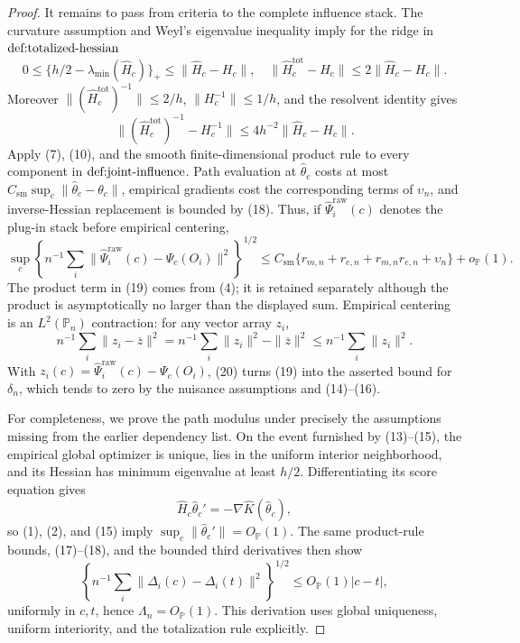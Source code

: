 \documentclass{article}
\begin{document}
\begin{proof}
It remains to pass from criteria to the complete influence stack. The curvature assumption and Weyl's eigenvalue inequality imply for the ridge in \(\textnormal{def:totalized-hessian}\)
\[
 0\leq\{h/2-\lambda_{\min}(\widehat H_c)\}_+
 \leq\|\widehat H_c-H_c\|,
 \quad
 \|\widehat H_c^{\mathrm{tot}}-H_c\|
 \leq2\|\widehat H_c-H_c\|.
 \tag{17}
\]
Moreover \(\|(\widehat H_c^{\mathrm{tot}})^{-1}\|\leq2/h\), \(\|H_c^{-1}\|\leq1/h\), and the resolvent identity gives
\[
 \| (\widehat H_c^{\mathrm{tot}})^{-1}-H_c^{-1}\|
 \leq4h^{-2}\|\widehat H_c-H_c\|.
 \tag{18}
\]
Apply (7), (10), and the smooth finite-dimensional product rule to every component in \(\textnormal{def:joint-influence}\). Path evaluation at \(\widehat\theta_c\) costs at most \(C_{\mathrm{sm}}\sup_c\|\widehat\theta_c-\theta_c\|\), empirical gradients cost the corresponding terms of \(\upsilon_n\), and inverse-Hessian replacement is bounded by (18). Thus, if \(\widehat\Psi_i^{\mathrm{raw}}(c)\) denotes the plug-in stack before empirical centering,
\[
 \sup_c\left\{n^{-1}\sum_i
 \|\widehat\Psi_i^{\mathrm{raw}}(c)-\Psi_c(O_i)\|^2\right\}^{1/2}
 \leq C_{\mathrm{sm}}\{r_{m,n}+r_{e,n}+r_{m,n}r_{e,n}+\upsilon_n\}+o_{\mathbb P}(1).
 \tag{19}
\]
The product term in (19) comes from (4); it is retained separately although the product is asymptotically no larger than the displayed sum. Empirical centering is an \(L^2(\mathbb P_n)\) contraction: for any vector array \(z_i\),
\[
 n^{-1}\sum_i\|z_i-\overline z\|^2
 =n^{-1}\sum_i\|z_i\|^2-\|\overline z\|^2
 \leq n^{-1}\sum_i\|z_i\|^2.
 \tag{20}
\]
With \(z_i(c)=\widehat\Psi_i^{\mathrm{raw}}(c)-\Psi_c(O_i)\), (20) turns (19) into the asserted bound for \(\delta_n\), which tends to zero by the nuisance assumptions and (14)--(16).

For completeness, we prove the path modulus under precisely the assumptions missing from the earlier dependency list. On the event furnished by (13)--(15), the empirical global optimizer is unique, lies in the uniform interior neighborhood, and its Hessian has minimum eigenvalue at least \(h/2\). Differentiating its score equation gives
\[
 \widehat H_c\widehat\theta_c'=-\nabla\widehat K(\widehat\theta_c),
 \tag{21}
\]
so (1), (2), and (15) imply \(\sup_c\|\widehat\theta_c'\|=O_{\mathbb P}(1)\). The same product-rule bounds, (17)--(18), and the bounded third derivatives then show
\[
 \left\{n^{-1}\sum_i\|\Delta_i(c)-\Delta_i(t)\|^2\right\}^{1/2}
 \leq O_{\mathbb P}(1)|c-t|,
 \tag{22}
\]
uniformly in \(c,t\), hence \(\Lambda_n=O_{\mathbb P}(1)\). This derivation uses global uniqueness, uniform interiority, and the totalization rule explicitly.


\end{proof}
\end{document}
